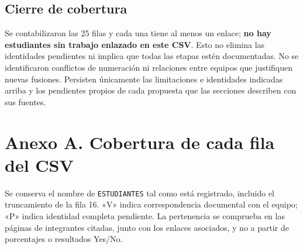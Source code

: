 \documentclass[11pt,a4paper]{article}
\begin{document}
\subsection*{Cierre de cobertura}
Se contabilizaron las 25 filas y cada una tiene al menos un enlace; \textbf{no hay estudiantes sin trabajo enlazado en este CSV}. Esto no elimina las identidades pendientes ni implica que todas las etapas estén documentadas. No se identificaron conflictos de numeración ni relaciones entre equipos que justifiquen nuevas fusiones. Persisten únicamente las limitaciones e identidades indicadas arriba y los pendientes propios de cada propuesta que las secciones describen con sus fuentes.

\clearpage
\section*{Anexo A. Cobertura de cada fila del CSV}
Se conserva el nombre de \texttt{ESTUDIANTES} tal como está registrado, incluido el truncamiento de la fila 16. «V» indica correspondencia documental con el equipo; «P» indica identidad completa pendiente. La pertenencia se comprueba en las páginas de integrantes citadas, junto con los enlaces asociados, y no a partir de porcentajes o resultados Yes/No.
\end{document}

